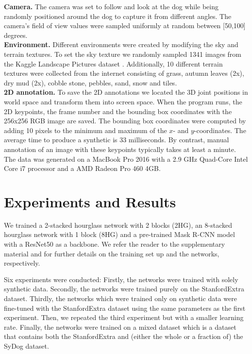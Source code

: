 \documentclass[final]{cvpr}
\begin{document}
\textbf{Camera.} The camera was set to follow and look at the dog while being randomly positioned around the dog to capture it from different angles. The camera's field of view values were sampled uniformly at random between [50,100] degrees.\\
\textbf{Environment.} Different environments were created by modifying the sky and terrain textures. To set the sky texture we randomly sampled 1341 images from the Kaggle Landscape Pictures dataset \cite{landscapedataset}. Additionally, 10 different terrain textures were collected from the internet consisting of grass, autumn leaves (2x), dry mud (2x), cobble stone, pebbles, sand, snow and tiles. \\\textbf{2D annotation.} To save the 2D annotations we located the 3D joint positions in world space and transform them into screen space. When the program runs, the 2D keypoints, the frame number and the bounding box coordinates with the 256x256 RGB image are saved. The bounding box coordinates were computed by adding 10 pixels to the minimum and maximum of the $x$- and $y$-coordinates. The average time to produce a synthetic is 33 milliseconds. By contrast, manual annotation of an image with these keypoints typically takes at least a minute. The data was generated on a MacBook Pro 2016 with a 2.9 GHz Quad-Core Intel Core i7 processor and a AMD Radeon Pro 460 4GB. 
\section{Experiments and Results}
We trained a 2-stacked hourglass network with 2 blocks (2HG), an 8-stacked hourglass network with 1 block (8HG) and a pre-trained Mask R-CNN model with a ResNet50 as a backbone. We refer the reader to the supplementary material and \cite{DBLP:journals/corr/HeGDG17, DBLP:journals/corr/NewellYD16} for further details on the training set up and the networks, respectively.

Six experiments were conducted: Firstly, the networks were trained with solely synthetic data. Secondly, the networks were trained purely on the StanfordExtra dataset. Thirdly, the networks which were trained only on synthetic data were fine-tuned with the StanfordExtra dataset using the same parameters as the first experiment. Then, we repeated the third experiment but with a smaller learning rate. Finally, the networks were trained on a mixed dataset which is a dataset that contains both the StanfordExtra and (either the whole or a fraction of) the SyDog dataset.
\end{document}
